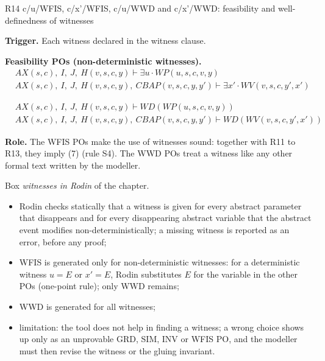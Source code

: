 \documentclass[11pt,a4paper]{article}
\newcommand{\WD}{\mathit{WD}}
\newcommand{\AX}{\mathit{AX}(s,c)}
\newcommand{\sff}[1]{\textsf{#1}}
\newcommand{\po}[1]{\textsf{\small #1}}
\newcommand{\champ}[1]{\par\smallskip\noindent\textbf{#1}\enspace}
\begin{document}
\begin{regle}{R14 \quad \po{c/u/WFIS}, \po{c/x'/WFIS}, \po{c/u/WWD} and \po{c/x'/WWD}: feasibility and well-definedness of witnesses}\label{sec:wfis}
  \champ{Trigger.} Each witness declared in the \sff{witness} clause.
  \champ{Feasibility POs (non-deterministic witnesses).}
  \begin{align*}
    &\AX,\ I,\ J,\ H(v,s,c,y) \vdash \exists u\cdot \mathit{WP}(u,s,c,v,y)\\
    &\AX,\ I,\ J,\ H(v,s,c,y),\ \mathit{CBAP}(v,s,c,y,y') \vdash \exists x'\cdot \mathit{WV}(v,s,c,y',x')
  \end{align*}
 
  \begin{align*}
    &\AX,\ I,\ J,\ H(v,s,c,y) \vdash \WD(\mathit{WP}(u,s,c,v,y))\\
    &\AX,\ I,\ J,\ H(v,s,c,y),\ \mathit{CBAP}(v,s,c,y,y') \vdash \WD(\mathit{WV}(v,s,c,y',x'))
  \end{align*}
  \champ{Role.} The \po{WFIS} POs make the use of witnesses sound: together with
  R11 to R13, they imply (7) (rule S4). The \po{WWD} POs treat a witness like any
  other formal text written by the modeller.
\end{regle}
\begin{rodin}
  Box \emph{witnesses in Rodin} of the chapter.
  \begin{itemize}
    \item Rodin checks statically that a witness is given for every abstract
      parameter that disappears and for every disappearing abstract variable that
      the abstract event modifies non-deterministically; a missing witness is
      reported as an error, before any proof;
    \item \po{WFIS} is generated only for non-deterministic witnesses: for a
      deterministic witness $u=E$ or $x'=E$, Rodin substitutes $E$ for the variable
      in the other POs (one-point rule); only \po{WWD} remains;
    \item \po{WWD} is generated for all witnesses;
    \item limitation: the tool does not help in finding a witness; a wrong choice
      shows up only as an unprovable \po{GRD}, \po{SIM}, \po{INV} or \po{WFIS} PO,
      and the modeller must then revise the witness or the gluing invariant.
  \end{itemize}
\end{rodin}
\end{document}

